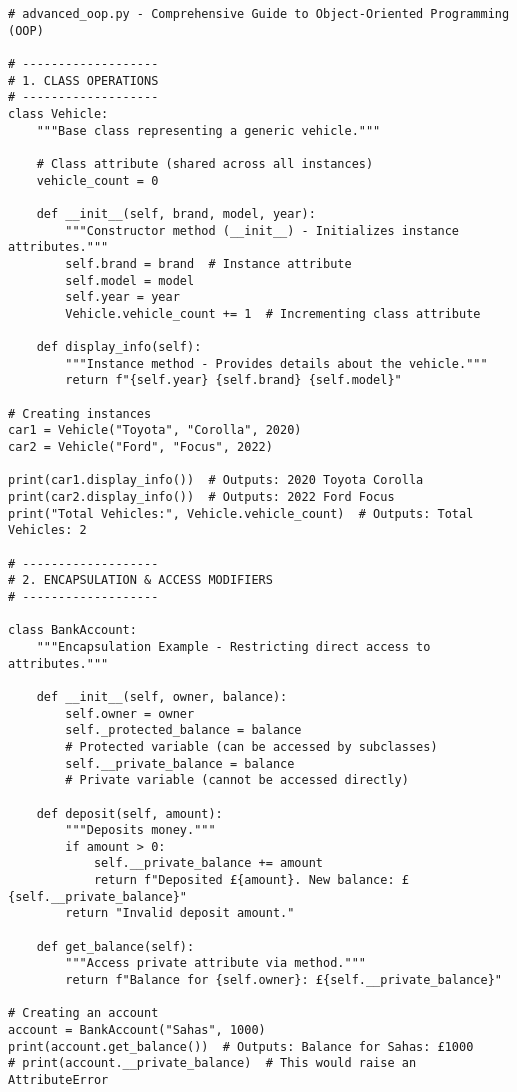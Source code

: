 \begin{verbatim}
# advanced_oop.py - Comprehensive Guide to Object-Oriented Programming (OOP)

# -------------------
# 1. CLASS OPERATIONS
# -------------------
class Vehicle:
    """Base class representing a generic vehicle."""
    
    # Class attribute (shared across all instances)
    vehicle_count = 0
    
    def __init__(self, brand, model, year):
        """Constructor method (__init__) - Initializes instance attributes."""
        self.brand = brand  # Instance attribute
        self.model = model
        self.year = year
        Vehicle.vehicle_count += 1  # Incrementing class attribute

    def display_info(self):
        """Instance method - Provides details about the vehicle."""
        return f"{self.year} {self.brand} {self.model}"

# Creating instances
car1 = Vehicle("Toyota", "Corolla", 2020)
car2 = Vehicle("Ford", "Focus", 2022)

print(car1.display_info())  # Outputs: 2020 Toyota Corolla
print(car2.display_info())  # Outputs: 2022 Ford Focus
print("Total Vehicles:", Vehicle.vehicle_count)  # Outputs: Total Vehicles: 2

# -------------------
# 2. ENCAPSULATION & ACCESS MODIFIERS
# -------------------

class BankAccount:
    """Encapsulation Example - Restricting direct access to attributes."""
    
    def __init__(self, owner, balance):
        self.owner = owner
        self._protected_balance = balance 
        # Protected variable (can be accessed by subclasses)
        self.__private_balance = balance  
        # Private variable (cannot be accessed directly)

    def deposit(self, amount):
        """Deposits money."""
        if amount > 0:
            self.__private_balance += amount
            return f"Deposited £{amount}. New balance: £{self.__private_balance}"
        return "Invalid deposit amount."

    def get_balance(self):
        """Access private attribute via method."""
        return f"Balance for {self.owner}: £{self.__private_balance}"

# Creating an account
account = BankAccount("Sahas", 1000)
print(account.get_balance())  # Outputs: Balance for Sahas: £1000
# print(account.__private_balance)  # This would raise an AttributeError


\end{verbatim}
